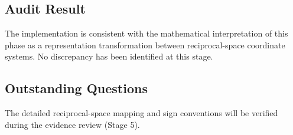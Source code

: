 \subsection{Audit Result}

The implementation is consistent with the mathematical interpretation of
this phase as a representation transformation between reciprocal-space
coordinate systems. No discrepancy has been identified at this stage.

\subsection{Outstanding Questions}

The detailed reciprocal-space mapping and sign conventions will be
verified during the evidence review (Stage 5).
